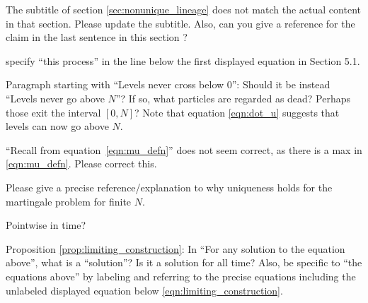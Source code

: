 \begin{point}{}
The subtitle of section \ref{sec:nonunique_lineage} does not match the actual content in that section. Please
update the subtitle. Also, can you give a reference for the claim in the last sentence in this
section \revref?
\end{point}

\reply{
}

\begin{point}{\revref}
specify ``this process'' in the line below the first displayed equation in
Section 5.1.
\end{point}

\reply{
}

\begin{point}{\revref}
Paragraph starting with ``Levels never cross below 0'': Should it be instead ``Levels never
go above $N$''? If so, what particles are regarded as dead? Perhaps those exit the interval
$[0, N]$? Note that equation \eqref{eqn:dot_u} suggests that levels can now go above $N$.
\end{point}

\reply{
}

\begin{point}{\revref}
``Recall from equation~\eqref{eqn:mu_defn}''
does not seem correct, as there is a max in \eqref{eqn:mu_defn}. Please
correct this.
\end{point}

\reply{
}

\begin{point}{\revref}
Please give a precise reference/explanation to why uniqueness holds for the martingale problem for finite $N$.
\end{point}


\begin{point}{\revref}
    Pointwise in time?
\end{point}

\reply{
    $\omega$
}

\begin{point}{\revref}
Proposition \ref{prop:limiting_construction}: In ``For any solution to the equation above'', what is a ``solution''? Is it
a solution for all time? Also, be specific to ``the equations above'' by labeling and referring
to the precise equations including the unlabeled displayed equation below \eqref{eqn:limiting_construction}.
\end{point}

